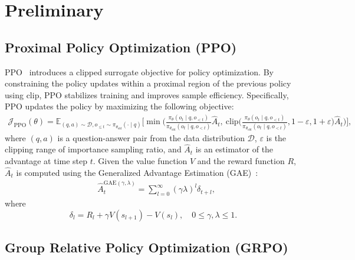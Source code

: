 \section{Preliminary}

\subsection{Proximal Policy Optimization (PPO)}
PPO~\cite{schulman2017proximal} introduces a clipped surrogate objective for policy optimization. By constraining the policy updates within a proximal region of the previous policy using clip, PPO stabilizes training and improves sample efficiency. Specifically, PPO updates the policy by maximizing the following objective:
\begin{equation}
\begin{aligned}
\mathcal{J}_\text{PPO}(\theta) = \mathbb{E}_{(q,a)\sim \mathcal{D},o_{\le t}\sim\pi_{\theta_{\text{old}}}(\cdot\mid q)}
\Bigg[ 
\min \Bigg( \frac{\pi_{\theta}(o_t\mid q,o_{<t})}{\pi_{\theta_{\text{old}}}(o_t\mid q,o_{<t})} \hat{A}_t,  
\ \text{clip} \Bigg( \frac{\pi_{\theta}(o_t\mid q,o_{<t})}{\pi_{\theta_{\text{old}}}(o_t\mid q,o_{<t})}, 1 - \varepsilon, 1 + \varepsilon \Bigg) \hat{A}_t \Bigg) \Bigg],
\label{eq:ppoloss}
\end{aligned}
\end{equation}
where $(q,a)$ is a question-answer pair from the data distribution $\mathcal{D}$, $\varepsilon$ is the clipping range of importance sampling ratio, and $\hat{A}_t$ is an estimator of the advantage at time step $t$. Given the value function $V$ and the reward function $R$, $\hat{A}_t$ is computed using the Generalized Advantage Estimation (GAE)~\cite{schulman2018highdimensionalcontinuouscontrolusing}:
\begin{equation}
\begin{aligned}
    &\hat{A}_t^{\text{GAE}(\gamma,\lambda)} = \sum_{l=0}^{\infty}(\gamma\lambda)^l\delta_{t+l},
\end{aligned}
\end{equation}
where
\begin{equation}
    \delta_{l}=R_l+\gamma V(s_{l+1})-V(s_l),\quad 0\le\gamma,\lambda\le1.
\end{equation}


\subsection{Group Relative Policy Optimization (GRPO)}

